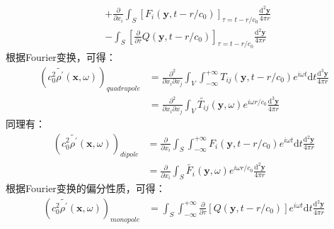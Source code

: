 \begin{enumerate}
\begin{equation}
\begin{aligned}
                &+\frac{\partial}{\partial x_{i}} \int_{S}\left[F_{i}\left(\mathbf{y}, t-r / c_{0}\right)\right]_{\tau=t-r / c_{0}} \frac{\mathrm{d}^{2} \mathbf{y}}{4 \pi r} \\
                &-\int_{S}\left[\frac{\partial}{\partial \tau} Q\left(\mathbf{y}, t-r / c_{0}\right)\right]_{\tau=t-r / c_{0}} \frac{\mathrm{d}^{2} \mathbf{y}}{4 \pi r}
            \end{aligned}
        \end{equation}
        根据Fourier变换，可得：
        \begin{equation}
            \begin{aligned}
                \left( c_{0}^{2} \tilde{\rho^{\prime}}(\mathbf{x}, \omega) \right)_{quadrupole}
                &= \frac{\partial^{2}}{\partial x_{i} \partial x_{j}} \int_{V} \int_{-\infty}^{+\infty} T_{i j}(\mathbf{y}, t-r / c_{0}) e^{i \omega t}\mathrm{d} t \frac{\mathrm{d}^{3} \mathbf{y}}{4 \pi r} \\
                &= \frac{\partial^{2}}{\partial x_{i} \partial x_{j}} \int_{V} \widetilde{T_{i j}}(\mathbf{y}, \omega) e^{i \omega r / c_{0}} \frac{\mathrm{d}^{3} \mathbf{y}}{4 \pi r}
            \end{aligned}
        \end{equation}
        同理有：
        \begin{equation}
            \begin{aligned}
                \left( c_{0}^{2} \tilde{\rho^{\prime}}(\mathbf{x}, \omega) \right)_{dipole}
                &= \frac{\partial}{\partial x_{i}} \int_{S} \int_{-\infty}^{+\infty} F_{i}(\mathbf{y}, t-r / c_{0}) e^{i \omega t}\mathrm{d} t \frac{\mathrm{d}^{2} \mathbf{y}}{4 \pi r} \\
                &= \frac{\partial}{\partial x_{i}} \int_{S} \widetilde{F_{i}}(\mathbf{y}, \omega) e^{i \omega r / c_{0}} \frac{\mathrm{d}^{2} \mathbf{y}}{4 \pi r}
            \end{aligned}
        \end{equation}
        根据Fourier变换的偏分性质，可得：
        \begin{equation}
            \begin{aligned}
                \left( c_{0}^{2} \tilde{\rho^{\prime}}(\mathbf{x}, \omega) \right)_{monopole}
                &= \int_{S} \int_{-\infty}^{+\infty} \frac{\partial}{\partial \tau} \left[Q\left(\mathbf{y}, t-r / c_{0}\right)\right] e^{i \omega t}\mathrm{d} t \frac{\mathrm{d}^{2} \mathbf{y}}{4 \pi r} \\

\end{aligned}
\end{equation}
\end{enumerate}
